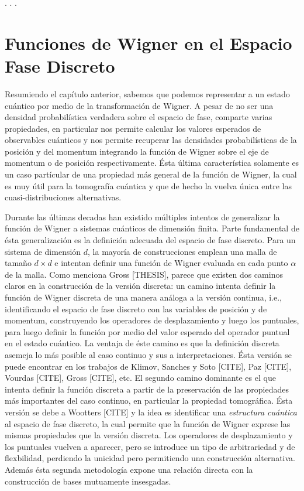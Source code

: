 \documentclass[a4paper]{report}
\begin{document}
  . . .

  \chapter{Funciones de Wigner en el Espacio Fase Discreto}

  Resumiendo el capítulo anterior, sabemos que podemos
  representar a un estado cuántico por medio de la
  transformación de Wigner.  A pesar de no ser una densidad
  probabilística verdadera sobre el espacio de fase,
  comparte varias propiedades, en particular nos permite
  calcular los valores esperados de observables cuánticos y
  nos permite recuperar las densidades probabilísticas de la
  posición y del momentum integrando la función de Wigner
  sobre el eje de momentum o de posición respectivamente.
  Ésta última característica solamente es un caso partícular
  de una propiedad más general de la función de Wigner, la
  cual es muy útil para la tomografía cuántica y que de
  hecho la vuelva única entre las cuasi-distribuciones
  alternativas.

  Durante las últimas decadas han existido múltiples
  intentos de generalizar la función de Wigner a sistemas
  cuánticos de dimensión finita. Parte fundamental de ésta
  generalización es la definición adecuada del espacio de
  fase discreto. Para un sistema de dimensión $d$, la
  mayoría de construcciones emplean una malla de tamaño $d
  \times d$ e intentan definir una función de Wigner
  evaluada en cada punto $\alpha$ de la malla. Como menciona
  Gross [THESIS], parece que existen dos caminos claros en
  la construcción de la versión discreta: un camino intenta
  definir la función de Wigner discreta de una manera
  análoga a la versión continua, i.e., identificando el
  espacio de fase discreto con las variables de posición y
  de momentum, construyendo los operadores de desplazamiento
  y luego los puntuales, para luego definir la función
  por medio del valor esperado del operador puntual en el
  estado cuántico. La ventaja de éste camino es
  que la definición discreta asemeja lo más posible al caso
  continuo y sus a interpretaciones.  Ésta versión se puede
  encontrar en los trabajos de Klimov, Sanches y Soto
  [CITE], Paz [CITE], Vourdas [CITE], Gross [CITE], etc. El
  segundo camino dominante es el que intenta definir la
  función discreta a partir de la preservación de las
  propiedades más importantes del caso continuo, en
  particular la propiedad tomográfica. Ésta versión se debe
  a Wootters [CITE] y la idea es identificar una
  \textit{estructura cuántica} al espacio de fase discreto,
  la cual permite que la función de Wigner exprese las
  mismas propiedades que la versión discreta.  Los
  operadores de desplazamiento y los puntuales vuelven a
  aparecer, pero se introduce un tipo de arbitrariedad y de
  flexbilidad, perdiendo la unicidad pero permitiendo una
  construcción alternativa. Además ésta segunda metodología
  expone una relación directa con la construcción de bases
  mutuamente insesgadas.
\end{document}
